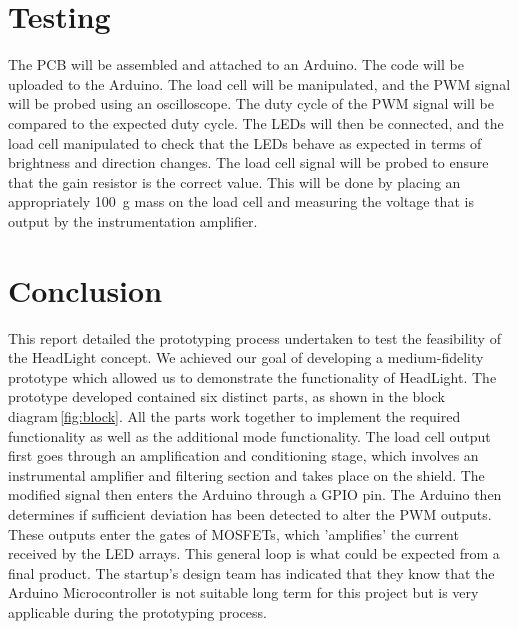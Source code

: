 \documentclass[twoside]{article}
\begin{document}



\section{Testing}
    The PCB will be assembled and attached to an Arduino. The code will be uploaded to the Arduino. The load cell will be manipulated, and the PWM signal will be probed using an oscilloscope. The duty cycle of the PWM signal will be compared to the expected duty cycle.
    The LEDs will then be connected, and the load cell manipulated to check that the LEDs behave as expected in terms of brightness and direction changes. 
    The load cell signal will be probed to ensure that the gain resistor is the correct value. This will be done by placing an appropriately \SI{100}{\gram} mass on the load cell and measuring the voltage that is output by the instrumentation amplifier.

\section{Conclusion}
    This report detailed the prototyping process undertaken to test the feasibility of the HeadLight concept. We achieved our goal of developing a medium-fidelity prototype which allowed us to demonstrate the functionality of HeadLight. The prototype developed contained six distinct parts, as shown in the block diagram \ref{fig:block}. All the parts work together to implement the required functionality as well as the additional mode functionality. The load cell output first goes through an amplification and conditioning stage, which involves an instrumental amplifier and filtering section and takes place on the shield. The modified signal then enters the Arduino through a GPIO pin. The Arduino then determines if sufficient deviation has been detected to alter the PWM outputs. These outputs enter the gates of MOSFETs, which 'amplifies' the current received by the LED arrays. This general loop is what could be expected from a final product. The startup's design team has indicated that they know that the Arduino Microcontroller is not suitable long term for this project but is very applicable during the prototyping process. 
\end{document}
